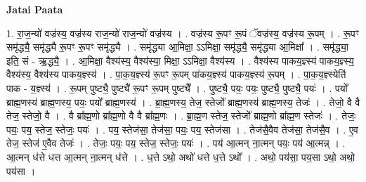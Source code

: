 \documentclass[17pt]{extarticle}
\begin{document}
\textbf{Jatai Paata} \newline

1. रा॒ज॒न्यो॑ वज्र॑स्य॒ वज्र॑स्य राज॒न्यो॑ राज॒न्यो॑ वज्र॑स्य । . वज्र॑स्य रू॒पꣳ रू॒पं ॅवज्र॑स्य॒ वज्र॑स्य रू॒पम् । . रू॒पꣳ समृ॑द्ध्यै॒ समृ॑द्ध्यै रू॒पꣳ रू॒पꣳ समृ॑द्ध्यै । . समृ॑द्ध्या आ॒मिक्षा॒ ऽऽमिक्षा॒ समृ॑द्ध्यै॒ समृ॑द्ध्या आ॒मिक्षा᳚ । . समृ॑द्ध्या॒ इति॒ सं - ऋ॒द्ध्यै॒ । . आ॒मिक्षा॒ वैश्य॑स्य॒ वैश्य॑स्या॒ मिक्षा॒ ऽऽमिक्षा॒ वैश्य॑स्य । . वैश्य॑स्य पाकय॒ज्ञ्स्य॑ पाकय॒ज्ञ्स्य॒ वैश्य॑स्य॒ वैश्य॑स्य पाकय॒ज्ञ्स्य॑ । . पा॒क॒य॒ज्ञ्स्य॑ रू॒पꣳ रू॒पम् पा॑कय॒ज्ञ्स्य॑ पाकय॒ज्ञ्स्य॑ रू॒पम् । . पा॒क॒य॒ज्ञ्स्येति॑ पाक - य॒ज्ञ्स्य॑ । . रू॒पम् पुष्ट्यै॒ पुष्ट्यै॑ रू॒पꣳ रू॒पम् पुष्ट्यै᳚ । . पुष्ट्यै॒ पयः॒ पयः॒ पुष्ट्यै॒ पुष्ट्यै॒ पयः॑ । . पयो᳚ ब्राह्म॒णस्य॑ ब्राह्म॒णस्य॒ पयः॒ पयो᳚ ब्राह्म॒णस्य॑ । . ब्रा॒ह्म॒णस्य॒ तेज॒ स्तेजो᳚ ब्राह्म॒णस्य॑ ब्राह्म॒णस्य॒ तेजः॑ । . तेजो॒ वै वै तेज॒ स्तेजो॒ वै । . वै ब्रा᳚ह्म॒णो ब्रा᳚ह्म॒णो वै वै ब्रा᳚ह्म॒णः । . ब्रा॒ह्म॒ण स्तेज॒ स्तेजो᳚ ब्राह्म॒णो ब्रा᳚ह्म॒ण स्तेजः॑ । . तेजः॒ पयः॒ पय॒ स्तेज॒ स्तेजः॒ पयः॑ । . पय॒ स्तेज॑सा॒ तेज॑सा॒ पयः॒ पय॒ स्तेज॑सा । . तेज॑सै॒वैव तेज॑सा॒ तेज॑सै॒व । . ए॒व तेज॒ स्तेज॑ ए॒वैव तेजः॑ । . तेजः॒ पयः॒ पय॒ स्तेज॒ स्तेजः॒ पयः॑ । . पय॑ आ॒त्मन् ना॒त्मन् पयः॒ पय॑ आ॒त्मन्न् । . आ॒त्मन् ध॑त्ते धत्त आ॒त्मन् ना॒त्मन् ध॑त्ते । . ध॒त्ते ऽथो॒ अथो॑ धत्ते ध॒त्ते ऽथो᳚ । . अथो॒ पय॑सा॒ पय॒सा ऽथो॒ अथो॒ पय॑सा । \newline
\end{document}
